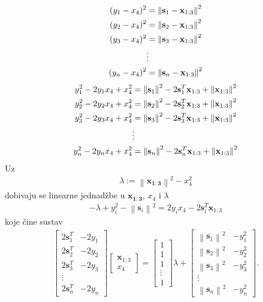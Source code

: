 \documentclass[a4paper,twoside,12pt]{memoir} %
\begin{document}
\begin{align}
(y_1 -x_4)^2 &= \left \| \mathbf{s}_1 - \mathbf{x}_{1:3} \right \|^2 \notag \\
(y_2 -x_4)^2 &= \left \| \mathbf{s}_2 - \mathbf{x}_{1:3} \right \|^2 \notag \\
(y_3 -x_4)^2 &= \left \| \mathbf{s}_3 - \mathbf{x}_{1:3} \right \|^2 \\
&\vdots \notag \\
(y_n -x_4)^2 &= \left \| \mathbf{s}_n - \mathbf{x}_{1:3} \right \|^2 \notag 
\end{align}
\begin{align}
y_1^2 -2y_1 x_4 + x_4^2 &= \left \| \mathbf{s}_1\right \|^2 -2\mathbf{s}_1^T\mathbf{x}_{1:3} +\left\|  \mathbf{x}_{1:3} \right \|^2 \notag \\
y_2^2 -2y_2 x_4 + x_4^2 &= \left \| \mathbf{s}_2\right \|^2 -2\mathbf{s}_2^T\mathbf{x}_{1:3} +\left\|  \mathbf{x}_{1:3} \right \|^2 \notag \\
y_3^2 -2y_3 x_4 + x_4^2 &= \left \| \mathbf{s}_3\right \|^2 -2\mathbf{s}_3^T\mathbf{x}_{1:3} +\left\|  \mathbf{x}_{1:3} \right \|^2 \\
&\vdots \notag \\
y_n^2 -2y_n x_4 + x_4^2 &= \left \| \mathbf{s}_n\right \|^2 -2\mathbf{s}_n^T\mathbf{x}_{1:3} +\left\|  \mathbf{x}_{1:3} \right \|^2 \notag 
\end{align}
Uz \begin{align*}
	\lambda := \left\| \mathbf{x_{1:3}}\right \|^2 - x_4^2
\end{align*}
dobivaju se linearne jednadžbe u $\mathbf{x_{1:3}}$, $x_4$ i $\lambda$
\begin{align*}
	-\lambda+y_i^2 - \left \| \mathbf{s}_i\right \|^2 = 2y_i x_4 - 2\mathbf{s}_i^T \mathbf{x}_{1:3} 
\end{align*}
koje čine sustav
\begin{align}
\begin{bmatrix}
2\mathbf{s}_1^T & -2y_1 \\
2\mathbf{s}_2^T & -2y_2 \\
2\mathbf{s}_3^T & -2y_3 \\
\vdots \\
2\mathbf{s}_n^T & -2y_n 
\end{bmatrix}
\begin{bmatrix}
\mathbf{x}_{1:3} \\
x_4
\end{bmatrix} =
\begin{bmatrix}
1 \\
1 \\
1 \\
\vdots \\
1 
\end{bmatrix} \lambda + 
\begin{bmatrix}
\left \| \mathbf{s}_1\right \|^2 & -y_1^2\\
\left \| \mathbf{s}_2\right \|^2 & -y_2^2\\
\left \| \mathbf{s}_3\right \|^2 & -y_3^2\\
\vdots \\
\left \| \mathbf{s}_n\right \|^2 & -y_n^2
\end{bmatrix}.
\end{align}
\end{document}
